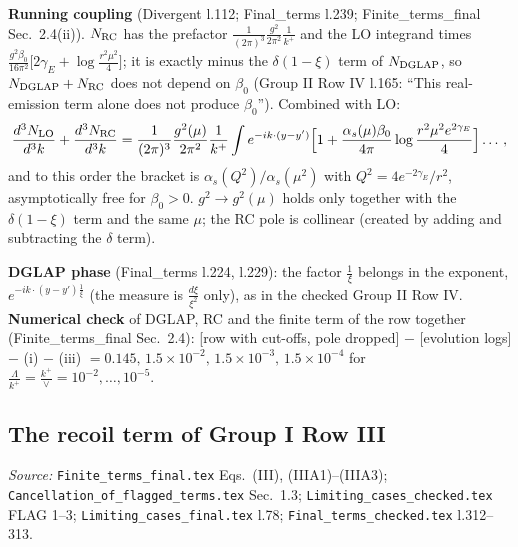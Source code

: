 \documentclass[10pt]{article}
\begin{document}
\noindent\textbf{Running coupling} (Divergent l.112; Final\_terms l.239; Finite\_terms\_final Sec.~2.4(ii)). $N_{\rm RC}$ has the prefactor $\frac{1}{(2\pi)^{3}}\frac{g^{2}}{2\pi^{2}}\frac{1}{k^{+}}$ and the LO integrand times $\frac{g^{2}\beta_{0}}{16\pi^{2}}\big[2\gamma_{E}+\log\frac{r^{2}\mu^{2}}{4}\big]$; it is exactly minus the $\delta(1-\xi)$ term of $N_{\rm DGLAP}$, so $N_{\rm DGLAP}+N_{\rm RC}$ does not depend on $\beta_{0}$ (Group II Row IV l.165: ``This real-emission term alone does not produce $\beta_{0}$''). Combined with LO:
\begin{align}
\frac{d^{3}N_{\rm LO}}{d^{3}k}+\frac{d^{3}N_{\rm RC}}{d^{3}k}=\frac{1}{(2\pi)^{3}}\frac{g^{2}(\mu)}{2\pi^{2}}\frac{1}{k^{+}}\int e^{-ik\cdot(y-y')}\Big[1+\frac{\alpha_{s}(\mu)\beta_{0}}{4\pi}\log\frac{r^{2}\mu^{2}e^{2\gamma_{E}}}{4}\Big]\dots\,,\notag
\end{align}
and to this order the bracket is $\alpha_{s}(Q^{2})/\alpha_{s}(\mu^{2})$ with $Q^{2}=4e^{-2\gamma_{E}}/r^{2}$, asymptotically free for $\beta_{0}>0$. $g^{2}\to g^{2}(\mu)$ holds only together with the $\delta(1-\xi)$ term and the same $\mu$; the RC pole is collinear (created by adding and subtracting the $\delta$ term).

\noindent\textbf{DGLAP phase} (Final\_terms l.224, l.229): the factor $\frac1\xi$ belongs in the exponent, $e^{-ik\cdot(y-y')\frac1\xi}$ (the measure is $\frac{d\xi}{\xi^{2}}$ only), as in the checked Group II Row IV. \textbf{Numerical check} of DGLAP, RC and the finite term of the row together (Finite\_terms\_final Sec.~2.4): [row with cut-offs, pole dropped] $-$ [evolution logs] $-$ (i) $-$ (iii) $=0.145,\,1.5\times10^{-2},\,1.5\times10^{-3},\,1.5\times10^{-4}$ for $\frac{\Lambda}{k^{+}}=\frac{k^{+}}{\vee}=10^{-2},\dots,10^{-5}$.

\subsection{The recoil term of Group I Row III}\label{sec:calc-recoil}
\noindent\emph{Source:} \texttt{Finite\_terms\_final.tex} Eqs.~(III), (IIIA1)--(IIIA3); \texttt{Cancellation\_of\_flagged\_terms.tex} Sec.~1.3; \texttt{Limiting\_cases\_checked.tex} FLAG 1--3; \texttt{Limiting\_cases\_final.tex} l.78; \texttt{Final\_terms\_checked.tex} l.312--313.
\end{document}
